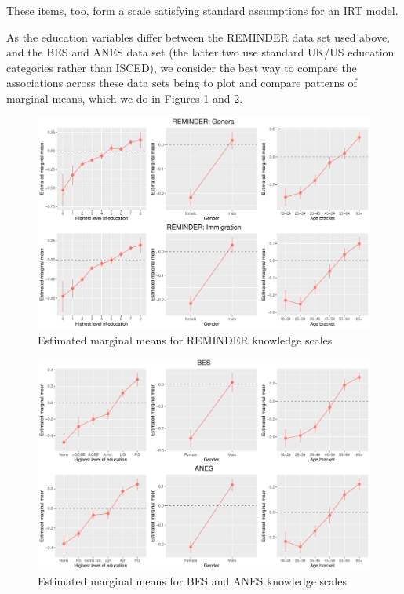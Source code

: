\documentclass[12pt,halfline,a4paper,]{ouparticle}
\begin{document}
These items, too, form a scale satisfying standard assumptions for an
IRT model.

As the education variables differ between the REMINDER data set used
above, and the BES and ANES data set (the latter two use standard UK/US
education categories rather than ISCED), we consider the best way to
compare the associations across these data sets being to plot and
compare patterns of marginal means, which we do in Figures
\ref{fig:emmeans_plots1} and \ref{fig:emmeans_plots2}.

\begin{figure}[!h]
\includegraphics[width=1\linewidth]{Revisiting-the-Measurement-and-Dimensionality-of-Political-Knowledge--Evidence-from-Seven-European-Countries_files/figure-latex/emmeans_plots1-1} \caption{Estimated marginal means for REMINDER knowledge scales}\label{fig:emmeans_plots1}
\end{figure}

\begin{figure}[!h]
\includegraphics[width=1\linewidth]{Revisiting-the-Measurement-and-Dimensionality-of-Political-Knowledge--Evidence-from-Seven-European-Countries_files/figure-latex/emmeans_plots2-1} \caption{Estimated marginal means for BES and ANES knowledge scales}\label{fig:emmeans_plots2}
\end{figure}
\end{document}
